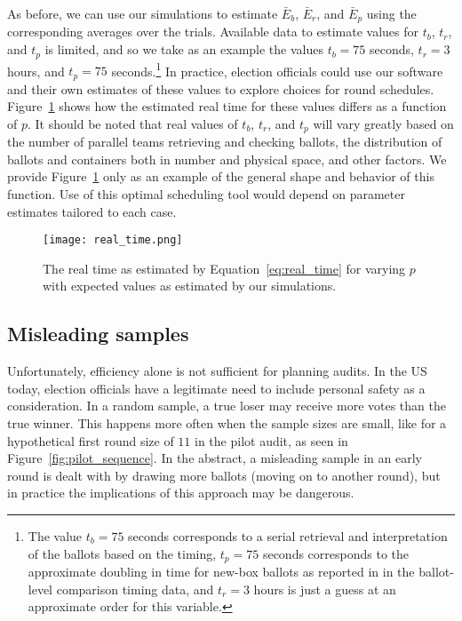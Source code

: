 As before, we can use our simulations to estimate $\bar E_b$, $\bar E_r$, and $\bar E_p$ using the corresponding averages over the trials. 
Available data to estimate values for $t_b$, $t_r$, and $t_p$ is limited, and so we take as an example the values $t_b=75$ seconds, $t_r=3$ hours, and $t_p=75$ seconds.\footnote{The value $t_b=75$ seconds corresponds to a serial retrieval and interpretation of the ballots based on the \cite{RI-report} timing, $t_p=75$ seconds corresponds to the approximate doubling in time for new-box ballots as reported in \cite{RI-report} in the ballot-level comparison timing data, and $t_r=3$ hours is just a guess at an approximate order for this variable.} In practice, election officials could use our software and their own estimates of these values to explore choices for round schedules. Figure~\ref{fig:real_time} shows how the estimated real time for these values differs as a function of $p$. It should be noted that real values of $t_b$, $t_r$, and $t_p$ will vary greatly based on the number of parallel teams retrieving and checking ballots, the distribution of ballots and containers both in number and physical space, and other factors. We provide Figure~\ref{fig:real_time} only as an example of the general shape and behavior of this function. Use of this optimal scheduling tool would depend on parameter estimates tailored to each case.

\begin{figure}
\texttt{[image: real\_time.png]}
\caption{The real time as estimated by Equation~\ref{eq:real_time} for varying $p$ with expected values as estimated by our simulations.}
\label{fig:real_time}
\end{figure}


\subsection{Misleading samples}

Unfortunately, efficiency alone is not sufficient for planning audits. In the US today, election officials have a legitimate need to include personal safety as a consideration.
In a random sample, a true loser may receive more votes than the true winner. This happens more often when the sample sizes are small, like for a hypothetical first round size of $11$ in the pilot audit, as seen in Figure~\ref{fig:pilot_sequence}.
In the abstract, a misleading sample in an early round is dealt with by drawing more ballots (moving on to another round), but in practice the implications of this approach may be dangerous.

